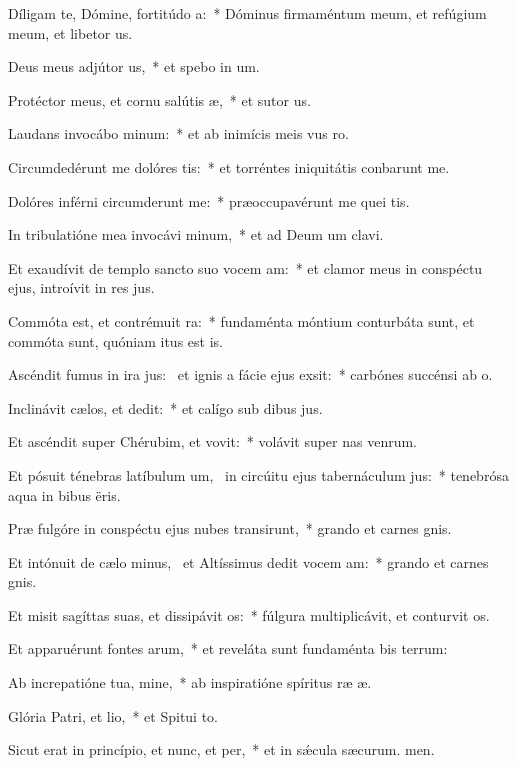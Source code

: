 \item Díligam te, Dómine, fortitúdo a:~* Dóminus firmaméntum meum, et refúgium meum, et libetor us.
\item Deus meus adjútor us,~* et spebo in um.
\item Protéctor meus, et cornu salútis æ,~* et sutor us.
\item Laudans invocábo minum:~* et ab inimícis meis vus ro.
\item Circumdedérunt me dolóres tis:~* et torréntes iniquitátis conbarunt me.
\item Dolóres inférni circumderunt me:~* præoccupavérunt me quei tis.
\item In tribulatióne mea invocávi minum,~* et ad Deum um clavi.
\item Et exaudívit de templo sancto suo vocem am:~* et clamor meus in conspéctu ejus, introívit in res jus.
\item Commóta est, et contrémuit ra:~* fundaménta móntium conturbáta sunt, et commóta sunt, quóniam itus est is.
\item Ascéndit fumus in ira jus:~\pscross{} et ignis a fácie ejus exsit:~* carbónes succénsi  ab o.
\item Inclinávit cælos, et dedit:~* et calígo sub dibus jus.
\item Et ascéndit super Chérubim, et vovit:~* volávit super nas venrum.
\item Et pósuit ténebras latíbulum um,~\pscross{} in circúitu ejus tabernáculum jus:~* tenebrósa aqua in bibus ëris.
\item Præ fulgóre in conspéctu ejus nubes transirunt,~* grando et carnes gnis.
\item Et intónuit de cælo minus,~\pscross{} et Altíssimus dedit vocem am:~* grando et carnes gnis.
\item Et misit sagíttas suas, et dissipávit os:~* fúlgura multiplicávit, et conturvit os.
\item Et apparuérunt fontes arum,~* et reveláta sunt fundaménta bis terrum:
\item Ab increpatióne tua, mine,~* ab inspiratióne spíritus ræ æ.
\item Glória Patri, et lio,~* et Spitui to.
\item Sicut erat in princípio, et nunc, et per,~* et in sǽcula sæcurum. men.
